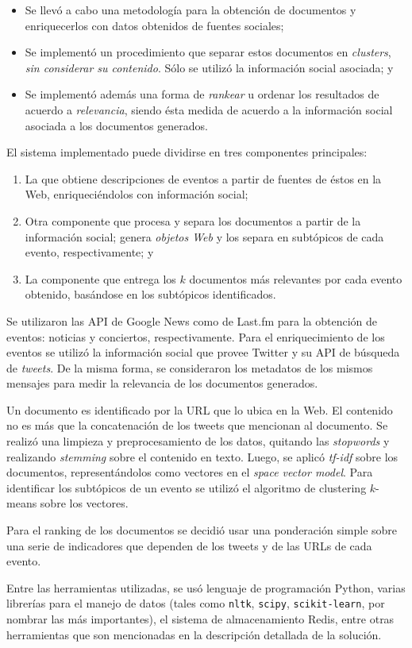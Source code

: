 \begin{itemize}
\item Se llevó a cabo una metodología para la obtención de documentos y
     enriquecerlos con datos obtenidos de fuentes sociales;
\item Se implementó un procedimiento que separar estos documentos en
     \emph{clusters}, \emph{sin considerar su contenido}. Sólo se utilizó la
     información social asociada; y
\item Se implementó además una forma de \emph{rankear} u ordenar los
     resultados de acuerdo a \emph{relevancia}, siendo ésta medida de
     acuerdo a la información social asociada a los documentos
     generados.
\end{itemize}
   El sistema implementado puede dividirse en tres componentes
   principales:
\begin{enumerate}
\item La que obtiene descripciones de eventos a partir de fuentes de
      éstos en la Web, enriqueciéndolos con información social;
\item Otra componente que procesa y separa los documentos a partir de
      la información social; genera \emph{objetos Web} y los separa en
      subtópicos de cada evento, respectivamente; y
\item La componente que entrega los $k$ documentos más relevantes por
      cada evento obtenido, basándose en los subtópicos identificados.
\end{enumerate}
   Se utilizaron las API de Google News como de Last.fm para la
   obtención de eventos: noticias y conciertos, respectivamente. Para
   el enriquecimiento de los eventos se utilizó la información social
   que provee Twitter y su API de búsqueda de \emph{tweets}. De la misma
   forma, se consideraron los metadatos de los mismos mensajes para medir
   la relevancia de los documentos generados.

   Un documento es identificado por la URL que lo ubica en la Web. El
   contenido no es más que la concatenación de los tweets que
   mencionan al documento. Se realizó una limpieza y preprocesamiento
   de los datos, quitando las \emph{stopwords} y realizando \emph{stemming}
   sobre el contenido en texto. Luego, se aplicó \emph{tf-idf} sobre los
   documentos, representándolos como vectores en el \emph{space vector    model}. Para identificar los subtópicos de un evento se utilizó el
   algoritmo de clustering $k$-means sobre los vectores.

   Para el ranking de los documentos se decidió usar una ponderación
   simple sobre una serie de indicadores que dependen de los tweets y
   de las URLs de cada evento.

   Entre las herramientas utilizadas, se usó lenguaje de
   programación Python, varias librerías para el manejo de datos
   (tales como \texttt{nltk}, \texttt{scipy}, \texttt{scikit-learn}, por nombrar las más
   importantes), el sistema de almacenamiento Redis, entre otras
   herramientas que son mencionadas en la descripción detallada de la
   solución.